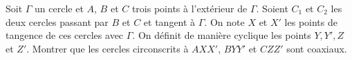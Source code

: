 Soit $\Gamma$ un cercle et $A$, $B$ et $C$ trois points à l'extérieur de $\Gamma$. Soient $C_1$ et $C_2$ les deux cercles passant par $B$ et $C$ et tangent à $\Gamma$. On note $X$ et $X'$ les points de tangence de ces cercles avec $\Gamma$. On définit de manière cyclique les points $Y, Y', Z$ et $Z'$. Montrer que les cercles circonscrits à $AXX'$, $BYY'$ et $CZZ'$ sont coaxiaux.